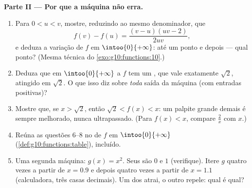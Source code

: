 \begin{problem}
\medskip
\noindent\textbf{Parte II --- Por que a máquina não erra.}
\begin{enumerate}[resume]
  \item Para $0 < u < v$, mostre, reduzindo ao mesmo
        denominador, que
        \[
        f(v) - f(u) = \frac{(v - u)(uv - 2)}{2uv} ,
        \]
        e deduza a variação de $f$ em $\intoo{0}{+\infty}$:
         até um ponto e  depois --- qual
        ponto? (Mesma técnica do
        \cref{exo:g10:functions:10}.)
  \item Deduza que em $\intoo{0}{+\infty}$ a  $f$ tem um
        , que vale exatamente $\sqrt2$, atingido em
        $\sqrt2$. O que isso diz sobre \emph{toda} saída da
        máquina (com entradas positivas)?
  \item Mostre que, se $x > \sqrt2$, então
        $\sqrt2 < f(x) < x$: um palpite grande demais é sempre
        melhorado, nunca ultrapassado. (Para $f(x) < x$, compare
        $\frac2x$ com $x$.)
  \item Reúna as questões 6--8 no  de $f$ em
        $\intoo{0}{+\infty}$
        (\cref{def:g10:functions:table}),  incluído.
  \item Uma segunda máquina: $g(x) = x^2$. Seus  são
        $0$ e $1$ (verifique). Itere $g$ quatro vezes a partir de
        $x = 0.9$ e depois quatro vezes a partir de $x = 1.1$
        (calculadora, três casas decimais). Um dos 
        atrai, o outro repele: qual é qual?
\end{enumerate}


\end{problem}

